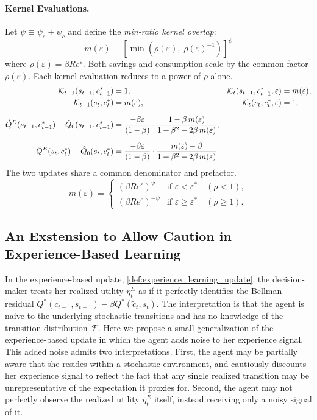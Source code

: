 \paragraph{Kernel Evaluations.}
Let $\psi \equiv \psi_s + \psi_c$ and define the \textit{min-ratio kernel overlap}:
\begin{equation}
m(\varepsilon) \equiv \left[\min\!\left(\rho(\varepsilon),\; \rho(\varepsilon)^{-1}\right)\right]^{\psi}
\end{equation}
where $\rho(\varepsilon) = \beta R e^\varepsilon$. Both savings and consumption scale by the common factor $\rho(\varepsilon)$. Each kernel evaluation reduces to a power of $\rho$ alone.
\begin{align}
\mathcal{K}_{t-1}(s_{t-1}, c_{t-1}^*) &= 1, &
\mathcal{K}_t(s_{t-1}, c_{t-1}^*, \varepsilon) &= m(\varepsilon), \notag\\
\mathcal{K}_{t-1}(s_t, c_t^*) &= m(\varepsilon), &
\mathcal{K}_t(s_t, c_t^*, \varepsilon) &= 1, \notag\\[6pt]
%
\hat{Q}^E(s_{t-1}, c_{t-1}^*) - \hat{Q}_0(s_{t-1}, c_{t-1}^*)
&= \frac{-\beta\varepsilon}{(1-\beta)}
\cdot \frac{1 - \beta\, m(\varepsilon)}{1 + \beta^2 - 2\beta\, m(\varepsilon)}, \\[6pt]
%
\hat{Q}^E(s_t, c_t^*) - \hat{Q}_0(s_t, c_t^*)
&= \frac{-\beta\varepsilon}{(1-\beta)}
\cdot \frac{m(\varepsilon) - \beta}{1 + \beta^2 - 2\beta\, m(\varepsilon)}.
\end{align}
The two updates share a common denominator and prefactor. 
\begin{equation}
m(\varepsilon) =
\begin{cases}
(\beta R e^\varepsilon)^{\psi} & \text{if } \varepsilon < \varepsilon^* \quad (\rho < 1), \\[4pt]
(\beta R e^\varepsilon)^{-\psi} & \text{if } \varepsilon \geq \varepsilon^* \quad (\rho \geq 1).
\end{cases}
\end{equation}

\subsection{An Exstension to Allow Caution in Experience-Based Learning} \label{subsec:caution_in_experience_based_learning}

In the experience-based update, \ref{def:experience_learning_update}, the 
decision-maker treats her realized utility $\eta^E_t$ as if it perfectly identifies the 
Bellman residual $Q^*(c_{t-1}, s_{t-1}) - \beta Q^*(\tilde{c}_t, s_t)$. The interpretation 
is that the agent is naive to the underlying stochastic transitions and has no knowledge 
of the transition distribution $\mathcal{F}$. Here we propose a small generalization of 
the experience-based update in which the agent adds noise to her experience signal. This 
added noise admits two interpretations. First, the agent may be partially aware that she 
resides within a stochastic environment, and cautiously discounts her experience signal to 
reflect the fact that any single realized transition may be unrepresentative of the 
expectation it proxies for. Second, the agent may not perfectly observe the realized 
utility $\eta^E_t$ itself, instead receiving only a noisy signal of it.

